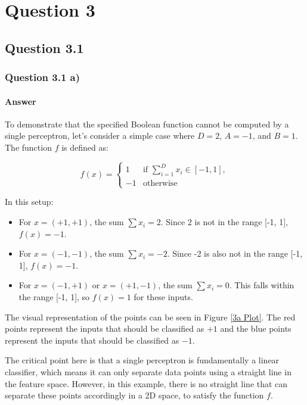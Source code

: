 \documentclass{article}
\begin{document}
\section{Question 3}

\subsection{Question 3.1}
\subsubsection{Question 3.1 a)}
\paragraph{Answer}

To demonstrate that the specified Boolean function cannot be computed by a single perceptron, let's consider a simple case where \( D = 2 \), \( A = -1 \), and \( B = 1 \). The function \( f \) is defined as:

\[
f(x) = 
\begin{cases} 
1 & \text{if } \sum_{i=1}^{D} x_i \in [-1, 1], \\
-1 & \text{otherwise}
\end{cases}
\]

In this setup:

\begin{itemize}
    \item For \( x = (+1, +1) \), the sum \( \sum x_i = 2 \). Since 2 is not in the range [-1, 1], \( f(x) = -1 \).
    \item For \( x = (-1, -1) \), the sum \( \sum x_i = -2 \). Since -2 is also not in the range [-1, 1], \( f(x) = -1 \).
    \item For \( x = (-1, +1) \) or \( x = (+1, -1) \), the sum \( \sum x_i = 0 \). This falls within the range [-1, 1], so \( f(x) = 1 \) for these inputs.
\end{itemize}

The visual representation of the points can be seen in Figure \ref{3a Plot}. The red points represent the inputs that should be classified as \( +1 \) and the blue points represent the inputs that should be classified as \( -1 \).

The critical point here is that a single perceptron is fundamentally a linear classifier, which means it can only separate data points using a straight line in the feature space. However, in this example, there is no straight line that can separate these points accordingly in a 2D space, to satisfy the function \( f \).
\end{document}

